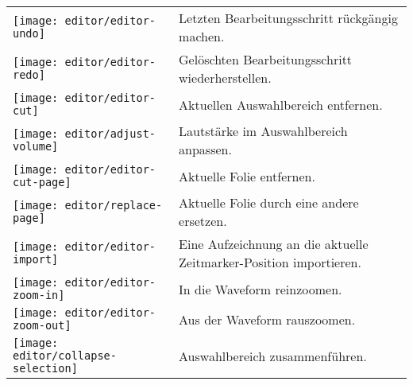 \begin{longtable}{p{1cm}p{12cm}}
	\begin{minipage}{.035\textwidth}
		\texttt{[image: editor/editor-undo]}
	\end{minipage}
	& Letzten Bearbeitungsschritt rückgängig machen. \\

	\begin{minipage}{.035\textwidth}
		\texttt{[image: editor/editor-redo]}
	\end{minipage}
	& Gelöschten Bearbeitungsschritt wiederherstellen. \\

	\begin{minipage}{.035\textwidth}
		\texttt{[image: editor/editor-cut]}
	\end{minipage}
	& Aktuellen Auswahlbereich entfernen. \\

	\begin{minipage}{.035\textwidth}
		\texttt{[image: editor/adjust-volume]}
	\end{minipage}
	& Lautstärke im Auswahlbereich anpassen. \\

	\begin{minipage}{.035\textwidth}
		\texttt{[image: editor/editor-cut-page]}
	\end{minipage}
	& Aktuelle Folie entfernen. \\

	\begin{minipage}{.035\textwidth}
		\texttt{[image: editor/replace-page]}
	\end{minipage}
	& Aktuelle Folie durch eine andere ersetzen. \\

	\begin{minipage}{.035\textwidth}
		\texttt{[image: editor/editor-import]}
	\end{minipage}
	& Eine Aufzeichnung an die aktuelle Zeitmarker-Position importieren. \\

	\begin{minipage}{.035\textwidth}
		\texttt{[image: editor/editor-zoom-in]}
	\end{minipage}
	& In die Waveform reinzoomen. \\

	\begin{minipage}{.035\textwidth}
		\texttt{[image: editor/editor-zoom-out]}
	\end{minipage}
	& Aus der Waveform rauszoomen. \\

	\begin{minipage}{.035\textwidth}
		\texttt{[image: editor/collapse-selection]}
	\end{minipage}
	& Auswahlbereich zusammenführen. \\
\end{longtable}

